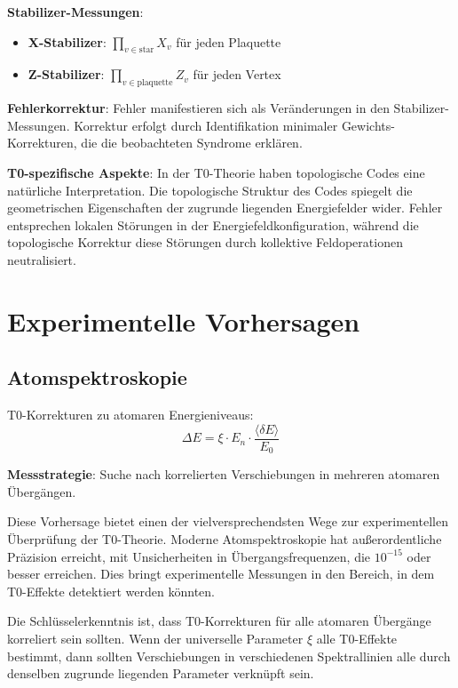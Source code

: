 \documentclass[12pt,a4paper]{article}
\newcommand{\deltaE}{\delta E}
\newcommand{\xipar}{\xi}
\theoremstyle{definition}
\theoremstyle{remark}
\begin{document}
\textbf{Stabilizer-Messungen}:
\begin{itemize}
	\item \textbf{X-Stabilizer}: $\prod_{v \in \text{star}} X_v$ f{\"u}r jeden Plaquette
	\item \textbf{Z-Stabilizer}: $\prod_{v \in \text{plaquette}} Z_v$ f{\"u}r jeden Vertex
\end{itemize}

\textbf{Fehlerkorrektur}:
Fehler manifestieren sich als Ver{\"a}nderungen in den Stabilizer-Messungen. Korrektur erfolgt durch Identifikation minimaler Gewichts-Korrekturen, die die beobachteten Syndrome erkl{\"a}ren.

\textbf{T0-spezifische Aspekte}:
In der T0-Theorie haben topologische Codes eine nat{\"u}rliche Interpretation. Die topologische Struktur des Codes spiegelt die geometrischen Eigenschaften der zugrunde liegenden Energiefelder wider. Fehler entsprechen lokalen St{\"o}rungen in der Energiefeldkonfiguration, w{\"a}hrend die topologische Korrektur diese St{\"o}rungen durch kollektive Feldoperationen neutralisiert.

\section{Experimentelle Vorhersagen}

\subsection{Atomspektroskopie}

T0-Korrekturen zu atomaren Energieniveaus:
\begin{equation}
	\Delta E = \xipar \cdot E_n \cdot \frac{\langle \deltaE \rangle}{E_0}
	\label{eq:spectroscopic_shift}
\end{equation}

\textbf{Messstrategie}: Suche nach korrelierten Verschiebungen in mehreren atomaren {\"U}berg{\"a}ngen.

Diese Vorhersage bietet einen der vielversprechendsten Wege zur experimentellen {\"U}berpr{\"u}fung der T0-Theorie. Moderne Atomspektroskopie hat au{\ss}erordentliche Pr{\"a}zision erreicht, mit Unsicherheiten in {\"U}bergangsfrequenzen, die $10^{-15}$ oder besser erreichen. Dies bringt experimentelle Messungen in den Bereich, in dem T0-Effekte detektiert werden k{\"o}nnten.

Die Schl{\"u}sselerkenntnis ist, dass T0-Korrekturen f{\"u}r alle atomaren {\"U}berg{\"a}nge korreliert sein sollten. Wenn der universelle Parameter $\xipar$ alle T0-Effekte bestimmt, dann sollten Verschiebungen in verschiedenen Spektrallinien alle durch denselben zugrunde liegenden Parameter verkn{\"u}pft sein.
\end{document}
